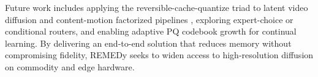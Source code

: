 \documentclass{article}
\begin{document}
Future work includes applying the reversible-cache-quantize triad to latent video diffusion and content-motion factorized pipelines \cite{yu_2024_efficient}, exploring expert-choice or conditional routers, and enabling adaptive PQ codebook growth for continual learning. By delivering an end-to-end solution that reduces memory without compromising fidelity, REMEDy seeks to widen access to high-resolution diffusion on commodity and edge hardware.




\end{document}
